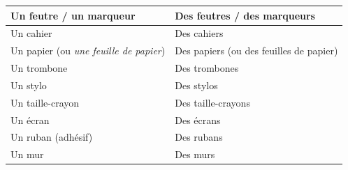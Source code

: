 \documentclass[11pt]{article}
\begin{document}
\begin{center}
\begin{tabular}{|p{7.5cm}|p{7.5cm}|}
\hline
Un feutre / un marqueur & Des feutres / des marqueurs \\
\hline
Un cahier & Des cahiers \\
\hline
Un papier (ou \emph{une feuille de papier}) & Des papiers (ou des feuilles de papier) \\
\hline
Un trombone & Des trombones \\
\hline
Un stylo & Des stylos \\
\hline
Un taille-crayon & Des taille-crayons \\
\hline
Un écran & Des écrans \\
\hline
Un ruban (adhésif) & Des rubans \\
\hline
Un mur & Des murs \\
\hline
\end{tabular}
\end{center}

\vspace{10pt}
\end{document}
